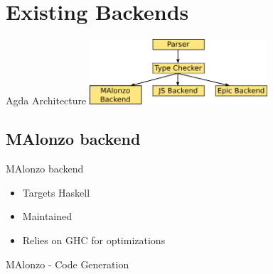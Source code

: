 \section{Existing Backends}

\begin{frame}[fragile]{Agda Architecture}
\includegraphics[width=250px]{agda-arch.png}
\end{frame}

\subsection{MAlonzo backend}
\begin{frame}{MAlonzo backend}
\begin{itemize}
\item Targets Haskell
\item Maintained
\item Relies on GHC for optimizations
\end{itemize}
\end{frame}

\begin{frame}[fragile]{MAlonzo - Code Generation}
\begin{code}%
\> \AgdaSymbol{:}  \AgdaSymbol{\{} \AgdaSymbol{\}}  \AgdaSymbol{(}  \AgdaSymbol{)}\<%
\\
\>[2]\<[4]%
\>[4]     \<%
\\
\>  \AgdaInductiveConstructor{[]} \AgdaSymbol{=} \<%
\\
\>  \AgdaSymbol{(} \AgdaInductiveConstructor{::} \AgdaSymbol{)} \AgdaSymbol{=}  \AgdaFunction{++} \AgdaSymbol{((} \AgdaSymbol{)}\<%
\\
\>[2]\<[4]%
\>[4]\AgdaFunction{++} \AgdaSymbol{(}  \AgdaSymbol{))}\<%
\end{code}
\end{frame}

